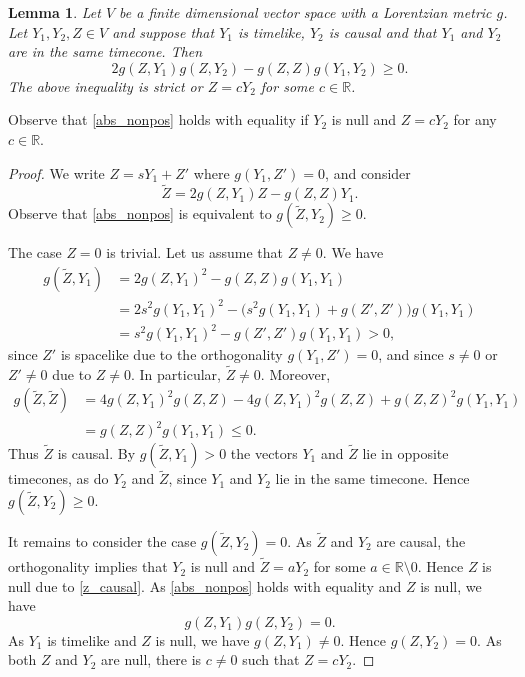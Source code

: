 \documentclass[12pt,reqno]{amsart}
\numberwithin{equation}{section}
\theoremstyle{definition}
\theoremstyle{plain}
\newtheorem{lemma}[theorem]{Lemma}
\theoremstyle{definition}
\theoremstyle{definition}
\newcommand{\R}{\mathbb{R}}
\def\R{\mathbb R}
\begin{document}
\begin{lemma}\label{lem_algebra}
Let $V$ be a finite dimensional vector space with a Lorentzian metric $g$.
Let $Y_1, Y_2, Z \in V$ and suppose that $Y_1$ is timelike, $Y_2$ is causal and that $Y_1$ and $Y_2$ are in the same timecone. Then
\begin{equation}\label{abs_nonpos}
2 g(Z, Y_1) g(Z, Y_2) - g(Z, Z) g(Y_1, Y_2) \ge 0.
\end{equation}
The above inequality is strict or $Z = cY_2$ for some $c \in \R$.
\end{lemma}
Observe that \eqref{abs_nonpos} holds with equality if $Y_2$ is null and $Z = cY_2$ for any $c \in \R$.
\begin{proof}
We write $Z = s Y_1 + Z'$ where $g(Y_1, Z') = 0$, and consider
\[
\tilde Z = 2 g(Z, Y_1) Z - g(Z, Z) Y_1.
\]
Observe that \eqref{abs_nonpos} is equivalent to $g(\tilde Z, Y_2) \ge 0$.

The case $Z = 0$ is trivial. Let us assume that $Z \ne 0$. We have
\begin{align*}
g(\tilde Z, Y_1)
&= 2 g(Z, Y_1)^2 - g(Z, Z) g(Y_1, Y_1)\\
&= 2 s^2 g(Y_1, Y_1)^2 - \bigl(s^2 g(Y_1, Y_1) + g(Z', Z')\bigr) g(Y_1, Y_1)\\
&= s^2 g(Y_1, Y_1)^2 - g(Z', Z') g(Y_1, Y_1) > 0,
\end{align*}
since $Z'$ is spacelike due to the orthogonality $g(Y_1, Z') = 0$, and since $s \ne 0$ or $Z' \ne 0$ due to $Z \ne 0$. In particular, $\tilde Z \ne 0$. Moreover,
\begin{equation}\label{z_causal}
\begin{aligned}
g(\tilde Z, \tilde Z)
&= 4 g(Z, Y_1)^2 g(Z, Z) - 4 g(Z, Y_1)^2 g(Z, Z) + g(Z, Z)^2 g(Y_1, Y_1)\\
&= g(Z, Z)^2 g(Y_1, Y_1) \le 0.
\end{aligned}
\end{equation}
Thus $\tilde Z$ is causal. By $g(\tilde Z, Y_1) > 0$ the vectors $Y_1$ and $\tilde Z$ lie in opposite timecones, as do $Y_2$ and $\tilde Z$, since $Y_1$ and $Y_2$ lie in the same timecone. Hence $g(\tilde Z, Y_2) \ge 0$.

It remains to consider the case $g(\tilde Z, Y_2) = 0$. As $\tilde Z$ and $Y_2$ are causal, the orthogonality implies that $Y_2$ is null and $\tilde Z = aY_2$ for some $a \in \R \setminus 0$. Hence $Z$ is null due to \eqref{z_causal}. As \eqref{abs_nonpos} holds with equality and $Z$ is null, we have
\[
g(Z, Y_1) g(Z, Y_2) = 0.
\]
As $Y_1$ is timelike and $Z$ is null, we have $g(Z, Y_1) \ne 0$. Hence $g(Z, Y_2) = 0$. As both $Z$ and $Y_2$ are null, there is $c \ne 0$ such that $Z = cY_2$.
\end{proof}
\end{document}

